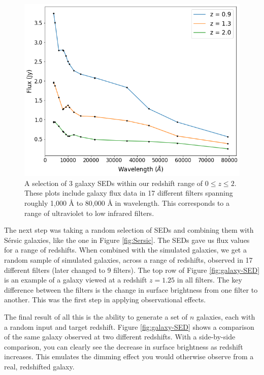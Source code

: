 \documentclass[fleqn,usenatbib]{mnras}
\begin{document}
\begin{figure}
    \includegraphics[width=\columnwidth]{Figures/SED.png}
    \caption{A selection of 3 galaxy SEDs within our redshift range of $0 \leq z \leq 2$. These plots include galaxy flux data in 17 different filters spanning roughly 1,000 \si{\angstrom} to 80,000 \si{\angstrom} in wavelength. This corresponds to a range of ultraviolet to low infrared filters.}
    \label{fig:SED}
\end{figure}

The next step was taking a random selection of SEDs and combining them with S\'ersic galaxies, like the one in Figure \ref{fig:Sersic}. The SEDs gave us flux values for a range of redshifts. When combined with the simulated galaxies, we get a random sample of simulated galaxies, across a range of redshifts, observed in 17 different filters (later changed to 9 filters). The top row of Figure \ref{fig:galaxy-SED} is an example of a galaxy viewed at a redshift $z = 1.25$ in all filters. The key difference between the filters is the change in surface brightness from one filter to another. This was the first step in applying observational effects.

The final result of all this is the ability to generate a set of $n$ galaxies, each with a random input and target redshift. Figure \ref{fig:galaxy-SED} shows a comparison of the same galaxy observed at two different redshifts. With a side-by-side comparison, you can clearly see the decrease in surface brightness as redshift increases. This emulates the dimming effect you would otherwise observe from a real, redshifted galaxy.
\end{document}
